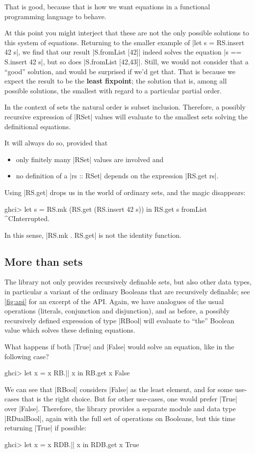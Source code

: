 \documentclass[manuscript,screen,acmsmall,nonacm]{acmart}
\begin{document}
That is good, because that is how we want equations in a functional programming language to behave.

At this point you might interject that these are not the only possible solutions to this system of equations. Returning to the smaller example of |let s = RS.insert 42 s|, we find that our result |S.fromList [42]| indeed solves the equation |s == S.insert 42 s|, but so does |S.fromList [42,43]|. Still, we would not consider that a “good” solution, and would be surprised if we'd get that.
%
That is because we expect the result to be the \textbf{least fixpoint}; the solution that is, among all possible solutions, the smallest with regard to a particular partial order.

In the context of sets the natural order is subset inclusion. Therefore, a possibly recursive expression of |RSet| values will evaluate to the smallest sets solving the definitional equations.

It will always do so, provided that
\begin{itemize}
\item only finitely many |RSet| values are involved and
\item no definition of a |rs :: RSet| depends on the expression |RS.get rs|.
\end{itemize}
Using |RS.get| drops us in the world of ordinary sets, and the magic disappears:
\begin{code}
ghci> let s = RS.mk (RS.get (RS.insert 42 s)) in RS.get s
fromList ^CInterrupted.
\end{code}
In this sense, |RS.mk . RS.get| is not the identity function.

\subsection{More than sets}

The library not only provides recursively definable sets, but also other data types, in particular a variant of the ordinary Booleans that are recursively definable; see \cref{fig:api} for an excerpt of the API. Again, we have analogues of the usual operations (literals, conjunction and disjunction), and as before, a possibly recursively defined expression of type |RBool| will evaluate to “the” Boolean value which solves these defining equations.

What happens if both |True| and |False| would solve an equation, like in the following case?
\begin{code}
ghci> let x = x RB.|| x in RB.get x
False
\end{code}
We can see that |RBool| considers |False| as the least element, and for some use-cases that is the right choice. But for other use-cases, one would prefer |True| over |False|. Therefore, the library provides a separate module and data type |RDualBool|, again with the full set of operations on Booleans, but this time returning |True| if possible:
\begin{code}
ghci> let x = x RDB.|| x in RDB.get x
True
\end{code}
\end{document}
